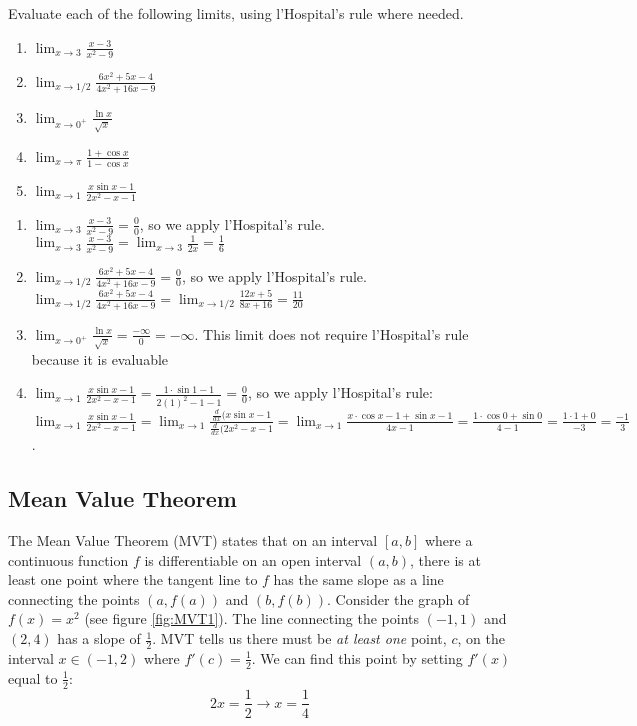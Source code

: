 \begin{Exercise}[label = LH2]
Evaluate each of the following limits, using l'Hospital's rule where needed.
\begin{enumerate}
\item $\lim_{x \to 3} \frac{x-3}{x^2-9}$
\item $\lim_{x \to 1/2} \frac{6x^2 + 5x - 4}{4x^2 + 16x - 9}$
\item $\lim_{x \to 0^+} \frac{\ln{x}}{\sqrt{x}}$
\item $\lim_{x \to \pi} \frac{1 + \cos{x}}{1 - \cos{x}}$
\item $\lim_{x \to 1} \frac{x\sin{x - 1}}{2x^2 - x - 1}$
\end{enumerate}
\end{Exercise}

\begin{Answer}[ref=LH2]
\begin{enumerate}
\item $\lim_{x \to 3} \frac{x-3}{x^2-9} = \frac{0}{0}$, so we apply l'Hospital's rule. $\lim_{x \to 3} \frac{x-3}{x^2-9} = \lim_{x \to 3} \frac{1}{2x} = \frac{1}{6}$
\item $\lim_{x \to 1/2} \frac{6x^2 + 5x - 4}{4x^2 + 16x - 9} = \frac{0}{0}$, so we apply l'Hospital's rule. $\lim_{x \to 1/2} \frac{6x^2 + 5x - 4}{4x^2 + 16x - 9} = \lim_{x \to 1/2} \frac{12x + 5}{8x + 16} = \frac{11}{20}$
\item $\lim_{x \to 0^+} \frac{\ln{x}}{\sqrt{x}} = \frac{-\infty}{0} = -\infty$. This limit does not require l'Hospital's rule because it is evaluable
\item $\lim_{x \to 1} \frac{x\sin{x - 1}}{2x^2 - x - 1} = \frac{1 \cdot \sin{1 - 1}}{2(1)^2 - 1 - 1} = \frac{0}{0}$, so we apply l'Hospital's rule: $\lim_{x \to 1} \frac{x\sin{x - 1}}{2x^2 - x - 1} = \lim_{x \to 1} \frac{\frac{d}{dx}(x\sin{x-1}}{\frac{d}{dx}(2x^2 - x - 1} = \lim_{x \to 1} \frac{x \cdot \cos{x - 1} + \sin{x - 1}}{4x - 1} = \frac{1 \cdot \cos{0} + \sin{0}}{4 - 1} = \frac{1 \cdot 1 + 0}{-3} = \frac{-1}{3}$. 
\end{enumerate}
\end{Answer}

\subsection{Mean Value Theorem}

The Mean Value Theorem (MVT) states that on an interval $[a, b]$ where a 
continuous function $f$ is differentiable on an open interval $(a, b)$, there 
is at least one point where the tangent line to $f$ has the same slope as a 
line connecting the points $(a, f(a))$ and $(b, f(b))$. Consider the graph of 
$f(x) = x^2$ (see figure \ref{fig:MVT1}). The line connecting the points 
$(-1, 1)$ and $(2, 4)$ has a slope of $\frac{1}{2}$. MVT tells us there must 
be \textit{at least one} point, $c$, on the interval $x \in (-1, 2)$ where 
$f'(c) = \frac{1}{2}$. We can find this point by setting $f'(x)$ equal to 
$\frac{1}{2}$: 
$$2x = \frac{1}{2} \rightarrow x = \frac{1}{4}$$

